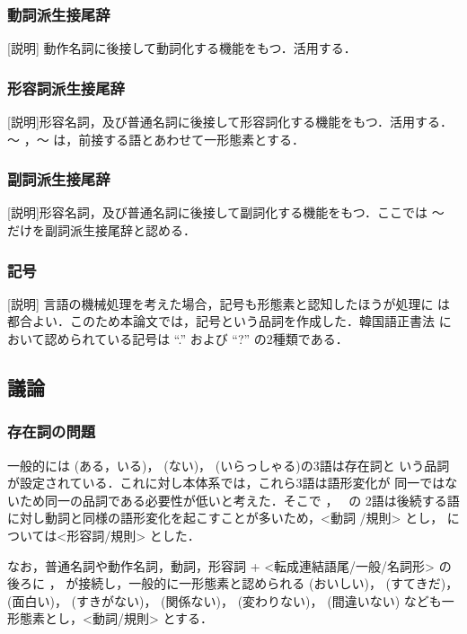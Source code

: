 \subsubsection{動詞派生接尾辞}        
[説明] 動作名詞に後接して動詞化する機能をもつ．活用する．

        
\subsubsection{形容詞派生接尾辞}        
[説明]形容名詞，及び普通名詞に後接して形容詞化する機能をもつ．活用する．
〜
，〜
 は，前接する語とあわせて一形態素とする．
        
        
\subsubsection{副詞派生接尾辞}        
[説明]形容名詞，及び普通名詞に後接して副詞化する機能をもつ．ここでは 〜
だけを副詞派生接尾辞と認める．

        
\subsubsection{記号}

[説明] 言語の機械処理を考えた場合，記号も形態素と認知したほうが処理に
は都合よい．このため本論文では，記号という品詞を作成した．韓国語正書法
において認められている記号は ``.'' および ``?'' の2種類である．



\subsection{議論}

\subsubsection{存在詞の問題}
\label{節:存在詞}

一般的には
(ある，いる)，
(ない)，
(いらっしゃる)の3語は存在詞と
いう品詞が設定されている．これに対し本体系では，これら3語は語形変化が
同一ではないため同一の品詞である必要性が低いと考えた．そこで 
，
\ の
2語は後続する語に対し動詞と同様の語形変化を起こすことが多いため，<動詞
/規則> とし，
 については<形容詞/規則> とした．

なお，普通名詞や動作名詞，動詞，形容詞 + <転成連結語尾/一般/名詞形> の
後ろに 
，
 が接続し，一般的に一形態素と認められる 
(おいしい)，
(すてきだ)，
(面白い)，
 (すきがない)，
(関係ない)，
(変わりない)，
(間違いない) なども一形態素とし，<動詞/規則> 
とする．


